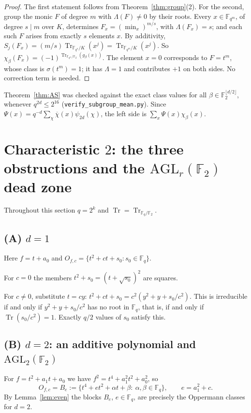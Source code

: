 \documentclass[11pt,a4paper]{amsart}
\theoremstyle{definition}
\theoremstyle{remark}
\newcommand{\F}{\mathbb{F}}
\newcommand{\Tr}{\operatorname{Tr}}
\newcommand{\AGL}{\mathrm{AGL}}
\begin{document}
\begin{proof}
The first statement follows from Theorem~\ref{thm:group}(2). For the second, group the monic $F$ of degree $m$ with
$\Lambda(F)\ne0$ by their roots. Every $x\in\F_{q^m}$, of degree $s\mid m$ over $K$, determines
$F_x=(\min_x)^{m/s}$, with $\Lambda(F_x)=s$; and each such $F$ arises from exactly $s$ elements $x$. By additivity,
$S_j(F_x)=(m/s)\Tr_{\F_{q^s}/K}(x^j)=\Tr_{\F_{q^m}/K}(x^j)$. So
$\chi_\beta(F_x)=(-1)^{\Tr_{\F_{q^m}/\F_2}(g_\beta(x))}$. The element $x=0$ corresponds to $F=t^m$, whose class is
$\sigma(t^m)=1$; it has $\Lambda=1$ and contributes $+1$ on both sides. No correction term is needed.
\end{proof}

Theorem~\ref{thm:AS} was checked against the exact class values for all $\beta\in\F_2^{\lfloor d/2\rfloor}$, whenever
$q^{2d}\le2^{16}$ (\texttt{verify\_subgroup\_mean.py}). Since $\Psi(x)=q^{-d}\sum_\chi\overline\chi(x)\psi_{2d}(\chi)$,
the left side is $\sum_x\Psi(x)\chi_\beta(x)$.

\section{\texorpdfstring{Characteristic $2$: the three obstructions and the $\AGL_r(\F_2)$ dead zone}{Characteristic 2: the three obstructions and the AGL(r,2) dead zone}}\label{sec:char2}

Throughout this section $q=2^k$ and $\Tr=\Tr_{\F_q/\F_2}$.

\subsection{\texorpdfstring{(A) $d=1$}{(A) d=1}}
Here $f=t+a_0$ and $O_{f,c}=\{t^2+ct+s_0:s_0\in\F_q\}$.

For $c=0$ the members $t^2+s_0=(t+\sqrt{s_0})^2$ are squares.

For $c\ne0$, substitute $t=cy$: $t^2+ct+s_0=c^2(y^2+y+s_0/c^2)$. This is irreducible if and only if
$y^2+y+s_0/c^2$ has no root in $\F_q$, that is, if and only if $\Tr(s_0/c^2)=1$. Exactly $q/2$ values of $s_0$
satisfy this.

\subsection{\texorpdfstring{(B) $d=2$: an additive polynomial and $\AGL_2(\F_2)$}{(B) d=2: an additive polynomial and AGL(2,2)}}
For $f=t^2+a_1t+a_0$ we have $f^2=t^4+a_1^2t^2+a_0^2$, so
\[
O_{f,c}=B_e:=\{t^4+et^2+\alpha t+\beta:\ \alpha,\beta\in\F_q\},\qquad e=a_1^2+c .
\]
By Lemma~\ref{lem:even} the blocks $B_e$, $e\in\F_q$, are precisely the Oppermann classes for $d=2$.
\end{document}
